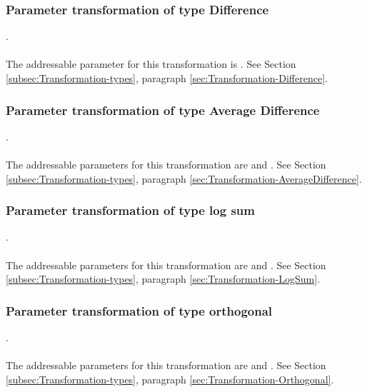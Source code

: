 \subsubsection{Parameter transformation of type Difference}
.
\label{syntax:Transformation-Difference} \\ \\
The addressable parameter for this transformation is . See Section \ref{subsec:Transformation-types}, paragraph \ref{sec:Transformation-Difference}.

\subsubsection{Parameter transformation of type Average Difference}
.
\label{syntax:Transformation-AverageDifference} \\ \\
The addressable parameters for this transformation are  and . See Section \ref{subsec:Transformation-types}, paragraph \ref{sec:Transformation-AverageDifference}.

\subsubsection{Parameter transformation of type log sum}
.
\label{syntax:Transformation-LogSum} \\ \\
The addressable parameters for this transformation are  and . See Section \ref{subsec:Transformation-types}, paragraph \ref{sec:Transformation-LogSum}.

\subsubsection{Parameter transformation of type orthogonal}
.
\label{syntax:Transformation-Orthogonal} \\ \\
The addressable parameters for this transformation are  and . See Section \ref{subsec:Transformation-types}, paragraph \ref{sec:Transformation-Orthogonal}.

